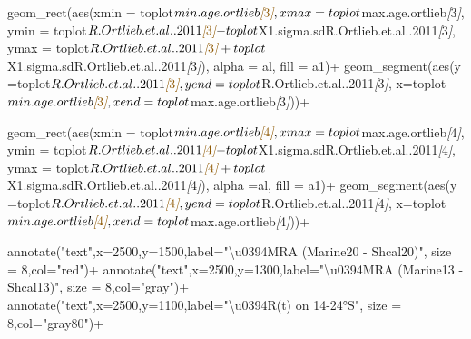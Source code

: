 \documentclass[
]{article}
\newenvironment{Shaded}{\begin{snugshade}}{\end{snugshade}}
\newcommand{\CommentTok}[1]{\textcolor[rgb]{0.56,0.35,0.01}{\textit{#1}}}
\newcommand{\NormalTok}[1]{#1}
\newcommand{\OtherTok}[1]{\textcolor[rgb]{0.56,0.35,0.01}{#1}}
\begin{document}
\begin{Shaded}
\begin{Highlighting}[]
\NormalTok{  geom\_rect(aes(xmin = toplot$min.age.ortlieb}\CommentTok{[}\OtherTok{3}\CommentTok{]}\NormalTok{, }
\NormalTok{                xmax = toplot$max.age.ortlieb}\CommentTok{[}\OtherTok{3}\CommentTok{]}\NormalTok{, }
\NormalTok{                ymin = toplot$R.Ortlieb.et.al..2011}\CommentTok{[}\OtherTok{3}\CommentTok{]}\NormalTok{{-}toplot$X1.sigma.sdR.Ortlieb.et.al..2011}\CommentTok{[}\OtherTok{3}\CommentTok{]}\NormalTok{,}
\NormalTok{                ymax = toplot$R.Ortlieb.et.al..2011}\CommentTok{[}\OtherTok{3}\CommentTok{]}\NormalTok{+toplot$X1.sigma.sdR.Ortlieb.et.al..2011}\CommentTok{[}\OtherTok{3}\CommentTok{]}\NormalTok{),}
\NormalTok{            alpha = al,}
\NormalTok{            fill = a1)+}
\NormalTok{  geom\_segment(aes(y =toplot$R.Ortlieb.et.al..2011}\CommentTok{[}\OtherTok{3}\CommentTok{]}\NormalTok{,}
\NormalTok{                   yend =toplot$R.Ortlieb.et.al..2011}\CommentTok{[}\OtherTok{3}\CommentTok{]}\NormalTok{,}
\NormalTok{                   x=toplot$min.age.ortlieb}\CommentTok{[}\OtherTok{3}\CommentTok{]}\NormalTok{,}
\NormalTok{                   xend=toplot$max.age.ortlieb}\CommentTok{[}\OtherTok{3}\CommentTok{]}\NormalTok{))+}
  
\NormalTok{  geom\_rect(aes(xmin = toplot$min.age.ortlieb}\CommentTok{[}\OtherTok{4}\CommentTok{]}\NormalTok{, }
\NormalTok{                xmax = toplot$max.age.ortlieb}\CommentTok{[}\OtherTok{4}\CommentTok{]}\NormalTok{, }
\NormalTok{                ymin = toplot$R.Ortlieb.et.al..2011}\CommentTok{[}\OtherTok{4}\CommentTok{]}\NormalTok{{-}toplot$X1.sigma.sdR.Ortlieb.et.al..2011}\CommentTok{[}\OtherTok{4}\CommentTok{]}\NormalTok{,}
\NormalTok{                ymax = toplot$R.Ortlieb.et.al..2011}\CommentTok{[}\OtherTok{4}\CommentTok{]}\NormalTok{+toplot$X1.sigma.sdR.Ortlieb.et.al..2011}\CommentTok{[}\OtherTok{4}\CommentTok{]}\NormalTok{),}
\NormalTok{            alpha =al,}
\NormalTok{            fill = a1)+}
\NormalTok{  geom\_segment(aes(y =toplot$R.Ortlieb.et.al..2011}\CommentTok{[}\OtherTok{4}\CommentTok{]}\NormalTok{,}
\NormalTok{                   yend=toplot$R.Ortlieb.et.al..2011}\CommentTok{[}\OtherTok{4}\CommentTok{]}\NormalTok{,}
\NormalTok{                   x=toplot$min.age.ortlieb}\CommentTok{[}\OtherTok{4}\CommentTok{]}\NormalTok{,}
\NormalTok{                   xend=toplot$max.age.ortlieb}\CommentTok{[}\OtherTok{4}\CommentTok{]}\NormalTok{))+}
  
\NormalTok{  annotate("text",x=2500,y=1500,label="\textbackslash{}u0394MRA (Marine20 {-} Shcal20)", size = 8,col="red")+}
\NormalTok{  annotate("text",x=2500,y=1300,label="\textbackslash{}u0394MRA (Marine13 {-} Shcal13)", size = 8,col="gray")+}
\NormalTok{  annotate("text",x=2500,y=1100,label="\textbackslash{}u0394R(t) on 14{-}24°S", size = 8,col="gray80")+}


\end{Highlighting}
\end{Shaded}
\end{document}
